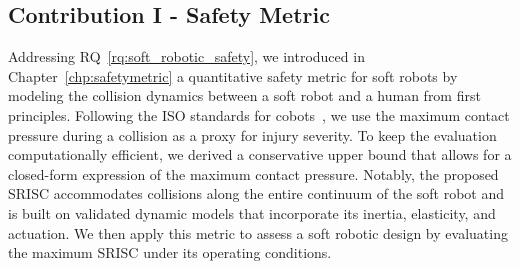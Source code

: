 \subsection{Contribution I - Safety Metric}
Addressing RQ~\ref{rq:soft_robotic_safety}, we introduced in Chapter~\ref{chp:safetymetric} a quantitative safety metric for soft robots by modeling the collision dynamics between a soft robot and a human from first principles. Following the ISO standards for cobots~\citep{Isots_15066_2016}, we use the maximum contact pressure during a collision as a proxy for injury severity. To keep the evaluation computationally efficient, we derived a conservative upper bound that allows for a closed-form expression of the maximum contact pressure. Notably, the proposed \gls{SRISC} accommodates collisions along the entire continuum of the soft robot and is built on validated dynamic models that incorporate its inertia, elasticity, and actuation. We then apply this metric to assess a soft robotic design by evaluating the maximum \gls{SRISC} under its operating conditions.

